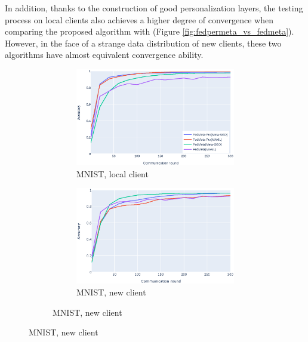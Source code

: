 \documentclass[runningheads]{llncs}
\begin{document}
In addition, thanks to the construction of good personalization layers, the testing process on local clients also achieves a higher degree of convergence when comparing the proposed algorithm with  (Figure \ref{fig:fedpermeta_vs_fedmeta}). However, in the face of a strange data distribution of new clients, these two algorithms have almost equivalent convergence ability.

\begin{figure}[h]
    \centering
    \begin{subfigure}{\textwidth}
        \centering
        \begin{subfigure}{.49\textwidth}
            \includegraphics[width=\linewidth]{img/mnist_old_metaper.eps}
            \caption{MNIST, local client}\label{mnist_old_metaper}
        \end{subfigure}
        \begin{subfigure}{.49\textwidth}
            \includegraphics[width=\linewidth]{img/mnist_new_metaper.eps}
            \caption{MNIST, new client}\label{mnist_new_metaper}

\end{subfigure}
\end{subfigure}
\end{figure}
\end{document}
